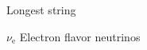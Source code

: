 
\begin{glossary}{Longest  string}
   \item[$\nu_{\mathrm e}$]
      Electron flavor neutrinos
\end{glossary}
